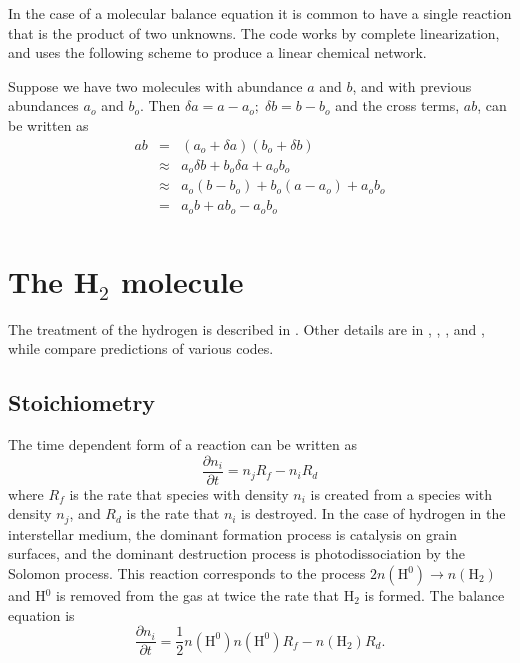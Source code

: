In the case of a molecular balance equation it is common to have a single
reaction that is the product of two unknowns.  The code works by complete
linearization, and uses the following scheme to produce a linear chemical
network.

Suppose we have two molecules with abundance $a$ and $b$, and with previous
abundances $a_o$ and $b_o$.  Then $\delta a = a - {a_o};\;\delta b = b -
{b_o}$ and the cross terms, $ab$, can be written as
\begin{equation}
\begin{array}{ccc}
 ab& =& \left( {{a_o} + \delta a} \right)\left( {{b_o} + \delta b} \right) \\
&\approx& {a_o}\delta b + {b_o}\delta a + {a_o}{b_o} \\
&\approx& {a_o}\left( {b - {b_o}} \right) + {b_o}\left( {a - {a_o}} \right)
+ {a_o}{b_o} \\
& =& {a_o}b + a{b_o} - {a_o}{b_o} \\
 \end{array}
\end{equation}

\section{The H$_2$ molecule}

The treatment of the hydrogen is described in \citet{Shaw2005}.  Other
details are in \citet{Ferland1989},
\citet{Ferland1994}, \citet{FerlandFabian2002}, and \citet{Abel2005}, while \citet{Roellig2007} compare
predictions of various codes.

\subsection{Stoichiometry}

The time dependent form of a reaction can be written as
\begin{equation}
\frac{{\partial {n_i}}}{{\partial t}} = {n_j}{R_f} - {n_i}{R_d}
\end{equation}
where $R_f$ is the rate that species with density $n_i$ is created from a species
with density $n_j$, and $R_d$ is the rate that $n_i$ is destroyed.  In the case of
hydrogen in the interstellar medium, the dominant formation process is
catalysis on grain surfaces, and the dominant destruction process is
photodissociation by the Solomon process.  This reaction corresponds to
the process $2n\left( {{{\mathrm{H}}^0}} \right) \to n\left( {{{\mathrm{H}}_2}}
\right)$
 and H$^0$ is removed from the gas at twice the rate that H$_2$ is formed.  The
balance equation is
\begin{equation}
\label{eqn:H2FormationBlance}
\frac{{\partial {n_i}}}{{\partial t}} = \frac{1}{2}n\left( {{{\mathrm{H}}^0}}
\right)n\left( {{{\mathrm{H}}^0}} \right){R_f} - n\left( {{{\mathrm{H}}_2}}
\right){R_d}.
\end{equation}

